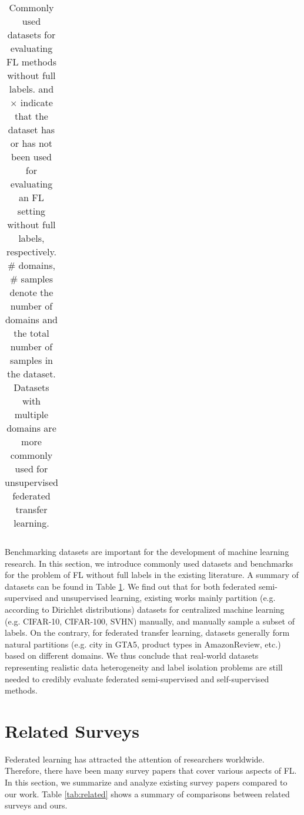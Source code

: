\documentclass[11pt]{article}
\newcommand{\cmark}{\ding{51}}
\begin{document}
\begin{table}[]
{\begin{tabular}{cccccccc}
    \bottomrule
    \end{tabular}}
    \caption{Commonly used datasets for evaluating FL methods without full labels. \cmark and $\times$ indicate that the dataset has or has not been used for evaluating an FL setting without full labels, respectively. \# domains, \# samples denote the number of domains and the total number of samples in the dataset. Datasets with multiple domains are more commonly used for unsupervised federated transfer learning. }
    \label{tab:flud_dataset}
\end{table}
Benchmarking datasets are important for the development of machine learning research. In this section, we introduce commonly used datasets and benchmarks for the problem of FL without full labels in the existing literature. A summary of datasets can be found in Table \ref{tab:flud_dataset}. We find out that for both federated semi-supervised and unsupervised learning, existing works mainly partition (e.g. according to Dirichlet distributions) datasets for centralized machine learning (e.g. CIFAR-10, CIFAR-100, SVHN) manually, and manually sample a subset of labels. On the contrary, for federated transfer learning, datasets generally form natural partitions (e.g. city in GTA5, product types in AmazonReview, etc.) based on different domains. We thus conclude that real-world datasets representing realistic data heterogeneity and label isolation problems are still needed to credibly evaluate federated semi-supervised and self-supervised methods. 

\section{Related Surveys}\label{sec:related}
Federated learning has attracted the attention of researchers worldwide. Therefore, there have been many survey papers that cover various aspects of FL. In this section, we summarize and analyze existing survey papers compared to our work. Table \ref{tab:related} shows a summary of comparisons between related surveys and ours. 
\end{document}
